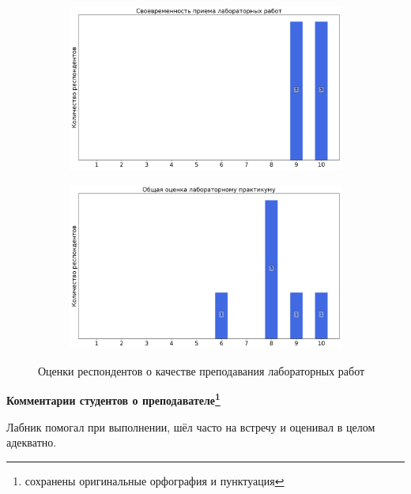 \begin{figure}[H]
\begin{subfigure}[b]{0.45\textwidth}
                    \centering
                    \includegraphics[width=\textwidth]{images/3 course/Общая физика - квантовая физика/labniks-marks-Судаков О.А.-2.png}
                \end{subfigure}
                \begin{subfigure}[b]{0.45\textwidth}
                    \centering
                    \includegraphics[width=\textwidth]{images/3 course/Общая физика - квантовая физика/labniks-marks-Судаков О.А.-3.png}
                \end{subfigure}	
                \caption{Оценки респондентов о качестве преподавания лабораторных работ}
            \end{figure}

            \textbf{Комментарии студентов о преподавателе\protect\footnote{сохранены оригинальные орфография и пунктуация}}
                \begin{commentbox} 
                    Лабник помогал при выполнении, шёл часто на встречу и оценивал в целом адекватно.  
                \end{commentbox} 
            

